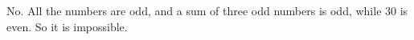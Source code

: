 No. All the numbers are odd, and a sum of three odd numbers is odd, while $30$ is even. So it is impossible.
